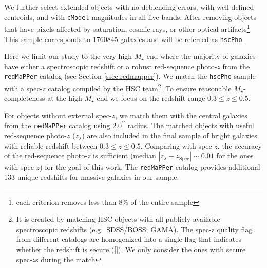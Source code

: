 \documentclass{emulateapj}
\def\arcsec{{\prime\prime}}
\def\redm{\texttt{redMaPPer}}
\def\mstar{{$M_{\star}$}}
\begin{document}
\begin{CJK*}{UTF8}{gbsn}
    We further select extended objects with no deblending errors, with well defined 
    centroids, and with \texttt{cModel} magnitudes in all five bands. 
    After removing objects that have pixels affected by saturation, cosmic-rays, or 
    other optical artifacts\footnote{each criterion removes less than 8\% of the 
    entire sample}
    This sample corresponds to 1760845 galaxies and will be referred as \texttt{hscPho}. 
        
    Here we limit our study to the very high-\mstar{} end where the majority of galaxies 
    have either a spectroscopic redshift or a robust red-sequence photo-$z$ from the 
    \redm{} catalog (see Section \ref{ssec:redmapper}).  
    We match the \texttt{hscPho} sample with a spec-$z$ catalog compiled by the HSC 
    team\footnote{It is created by matching HSC objects with all publicly available 
    spectroscopic redshifts (e.g.\ SDSS/BOSS; GAMA). The spec-z quality flag from 
    different catalogs are homogenized into a single flag that indicates whether the 
    redshift is secure (\ref{}). 
    We only consider the ones with secure spec-$z$s during the match}.  
    To ensure reasonable \mstar{}-completeness at the high-\mstar{} end we focus on
    the redshift range $0.3 \leq z \leq 0.5$. 
   
    For objects without external spec-$z$, we match them with the central galaxies 
    from the \redm{} catalog using $2.0^{\arcsec}$ radius. 
    The matched objects with useful red-sequence photo-$z$ ($z_{\lambda}$) are also 
    included in the final sample of bright galaxies with reliable redshift between 
    $0.3 \leq z \leq 0.5$. 
    Comparing with spec-$z$, the accuracy of the red-sequence photo-$z$ is sufficient 
    (median $|z_{\lambda} - z_{\mathrm{Spec}}| \sim 0.01$ for the ones with spec-$z$) 
    for the goal of this work.
    The \redm{} catalog provides additional 133 unique redshifts for massive galaxies 
    in our sample.
        

\end{CJK*}
\end{document}
